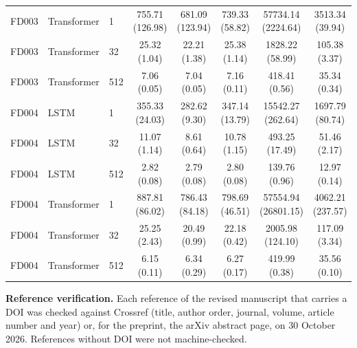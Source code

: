 \documentclass[10pt,a4paper]{article}
\begin{document}
\begin{center}
\begin{longtable}{lllccccc}
FD003 & Transformer & 1 & 755.71 (126.98) & 681.09 (123.94) & 739.33 (58.82) & 57734.14 (2224.64) & 3513.34 (39.94) \\
FD003 & Transformer & 32 & 25.32 (1.04) & 22.21 (1.38) & 25.38 (1.14) & 1828.22 (58.99) & 105.38 (3.37) \\
FD003 & Transformer & 512 & 7.06 (0.05) & 7.04 (0.05) & 7.16 (0.11) & 418.41 (0.56) & 35.34 (0.34) \\
FD004 & LSTM & 1 & 355.33 (24.03) & 282.62 (9.30) & 347.14 (13.79) & 15542.27 (262.64) & 1697.79 (80.74) \\
FD004 & LSTM & 32 & 11.07 (1.14) & 8.61 (0.64) & 10.78 (1.15) & 493.25 (17.49) & 51.46 (2.17) \\
FD004 & LSTM & 512 & 2.82 (0.08) & 2.79 (0.08) & 2.80 (0.08) & 139.76 (0.96) & 12.97 (0.14) \\
FD004 & Transformer & 1 & 887.81 (86.02) & 786.43 (84.18) & 798.69 (46.51) & 57554.94 (26801.15) & 4062.21 (237.57) \\
FD004 & Transformer & 32 & 25.25 (2.43) & 20.49 (0.99) & 22.18 (0.42) & 2005.98 (124.10) & 117.09 (3.34) \\
FD004 & Transformer & 512 & 6.15 (0.11) & 6.34 (0.29) & 6.27 (0.17) & 419.99 (0.38) & 35.56 (0.10) \\
\bottomrule\end{longtable}\end{center}
\noindent\textbf{Reference verification.} Each reference of the revised manuscript that carries a DOI was checked against Crossref (title, author order, journal, volume, article number and year) or, for the preprint, the arXiv abstract page, on 30 October 2026. References without DOI were not machine-checked.
\end{document}
